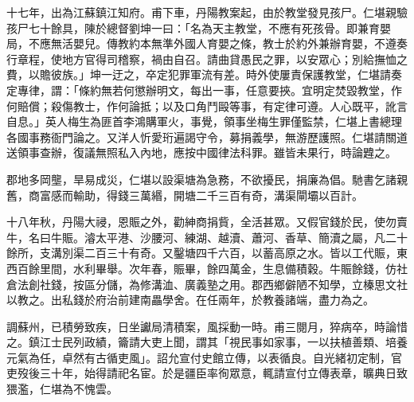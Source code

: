 \begin{pinyinscope}
十七年，出為江蘇鎮江知府。甫下車，丹陽教案起，由於教堂發見孩尸。仁堪親驗孩尸七十餘具，陳於總督劉坤一曰：「名為天主教堂，不應有死孩骨。即兼育嬰局，不應無活嬰兒。傳教約本無準外國人育嬰之條，教士於約外兼辦育嬰，不遵奏行章程，使地方官得司稽察，禍由自召。請曲貸愚民之罪，以安眾心；別給撫恤之費，以贍彼族。」坤一迂之，卒定犯罪軍流有差。時外使屢責保護教堂，仁堪請奏定專律，謂：「條約無若何懲辦明文，每出一事，任意要挾。宜明定焚毀教堂，作何賠償；殺傷教士，作何論抵；以及口角鬥毆等事，有定律可遵。人心既平，訛言自息。」英人梅生為匪首李鴻購軍火，事覺，領事坐梅生罪僅監禁，仁堪上書總理各國事務衙門論之。又洋人忻愛珩遍謁守令，募捐義學，無游歷護照。仁堪請關道送領事查辦，復議無照私入內地，應按中國律法科罪。雖皆未果行，時論韙之。

郡地多岡壟，旱易成災，仁堪以設渠塘為急務，不欲擾民，捐廉為倡。馳書乞諸親舊，商富感而輸助，得錢三萬緡，開塘二千三百有奇，溝渠閘壩以百計。

十八年秋，丹陽大祲，恩賑之外，勸紳商捐貲，全活甚眾。又假官錢於民，使勿賣牛，名曰牛賑。濬太平港、沙腰河、練湖、越瀆、蕭河、香草、簡瀆之屬，凡二十餘所，支溝別渠二百三十有奇。又鑿塘四千六百，以蓄高原之水。皆以工代賑，東西百餘里間，水利畢舉。次年春，賑畢，餘四萬金，生息備積穀。牛賑餘錢，仿社倉法創社錢，按區分儲，為修溝洫、廣義塾之用。郡西鄉僻陋不知學，立榛思文社以教之。出私錢於府治前建南畾學舍。在任兩年，於教養諸端，盡力為之。

調蘇州，已積勞致疾，日坐讞局清積案，風採動一時。甫三閱月，猝病卒，時論惜之。鎮江士民列政績，籥請大吏上聞，謂其「視民事如家事，一以扶植善類、培養元氣為任，卓然有古循吏風」。詔允宣付史館立傳，以表循良。自光緒初定制，官吏歿後三十年，始得請祀名宦。於是疆臣率徇眾意，輒請宣付立傳表章，曠典日致猥濫，仁堪為不愧雲。


\end{pinyinscope}